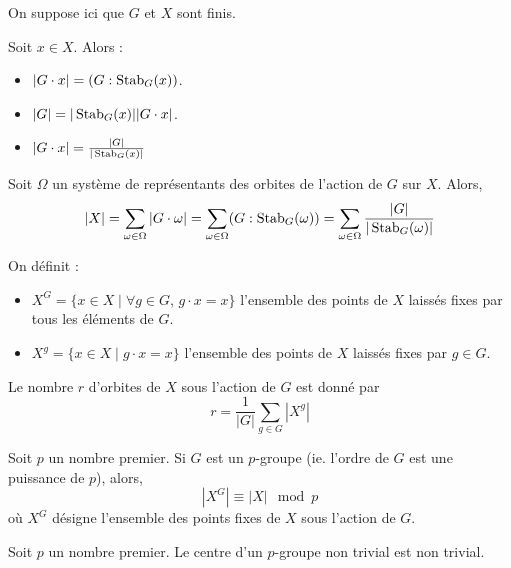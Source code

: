   On suppose ici que $G$ et $X$ sont finis.


  \begin{proposition}
    Soit $x \in X$. Alors :
    \begin{itemize}
      \item $|G \cdot x| = (G : \operatorname{Stab}_G(x))$.
      \item $|G| = |\operatorname{Stab}_G(x)| |G \cdot x|$.
      \item $|G \cdot x| = \frac{|G|}{|\operatorname{Stab}_G(x)|}$
    \end{itemize}
  \end{proposition}

  \begin{theorem}
    Soit $\Omega$ un système de représentants des orbites de l'action de $G$ sur $X$. Alors,
    \[ |X| = \sum_{\omega \in \Omega} |G \cdot \omega| = \sum_{\omega \in \Omega} (G : \operatorname{Stab}_G(\omega)) = \sum_{\omega \in \Omega} \frac{|G|}{|\operatorname{Stab}_G(\omega)|} \]
  \end{theorem}

  \begin{definition}
    On définit :
    \begin{itemize}
      \item $X^G = \{ x \in X \mid \forall g \in G, \, g \cdot x = x \}$ l'ensemble des points de $X$ laissés fixes par tous les éléments de $G$.
      \item $X^g = \{ x \in X \mid g \cdot x = x \}$ l'ensemble des points de $X$ laissés fixes par $g \in G$.
    \end{itemize}
  \end{definition}

  \begin{corollary}
    Le nombre $r$ d'orbites de $X$ sous l'action de $G$ est donné par
    \[ r = \frac{1}{|G|} \sum_{g \in G} |X^g| \]
  \end{corollary}

  \begin{corollary}
    Soit $p$ un nombre premier. Si $G$ est un $p$-groupe (ie. l'ordre de $G$ est une puissance de $p$), alors,
    \[ |X^G| \equiv |X| \mod p \]
    où $X^G$ désigne l'ensemble des points fixes de $X$ sous l'action de $G$.
  \end{corollary}

  \begin{corollary}
    Soit $p$ un nombre premier. Le centre d'un $p$-groupe non trivial est non trivial.
  \end{corollary}

